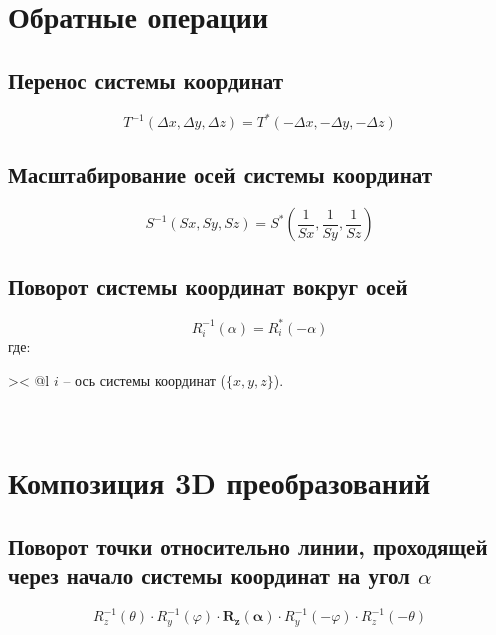 \documentclass[a4paper]{article}
\makeatletter
\theoremstyle{hangindent}
\theoremstyle{hangindent}
\newenvironment{where}[1][где:]
    {#1 \begin{tabular}[t]{>{}<{} @{${}{}$}l}}
    {\end{tabular}\\[\belowdisplayskip]}
\makeatother
\begin{document}
\section{Обратные операции}

\subsection{Перенос системы координат}
\begin{equation}
    T^{-1}(\Delta x, \Delta y, \Delta z) = T^*(-\Delta x, -\Delta y, -\Delta z)
\end{equation}

\subsection{Масштабирование осей системы координат}
\begin{equation}
    S^{-1}(Sx, Sy, Sz) = S^*\left(\frac{1}{Sx}, \frac{1}{Sy}, \frac{1}{Sz}\right)
\end{equation}

\subsection{Поворот системы координат вокруг осей}
\begin{equation}
    R^{-1}_i(\alpha) = R^*_i(-\alpha)
\end{equation}
\begin{where}
    $i$ -- ось системы координат ($\{x, y, z\}$).
\end{where}

\break

\section{Композиция 3D преобразований}

\subsection{Поворот точки относительно линии, проходящей через начало системы координат на угол $\alpha$}

\begin{equation}
    R^{-1}_z(\theta) \cdot R^{-1}_y(\varphi) \cdot \bm{R_z(\alpha)} \cdot R^{-1}_y(-\varphi) \cdot R^{-1}_z(-\theta)
\end{equation}
\end{document}
